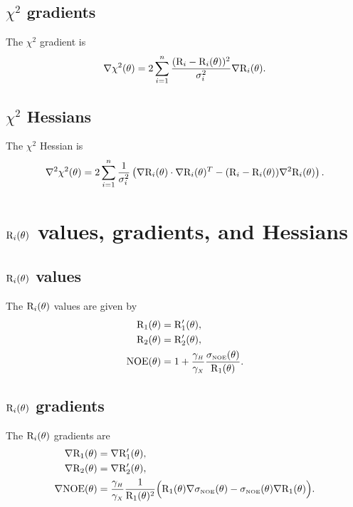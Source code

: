 \subsection{$\chi^2$ gradients}

The $\chi^2$ gradient is
\begin{equation}
 \nabla \chi^2(\theta) = 2 \sum_{i=1}^n \frac{(\mathrm{R}_i - \mathrm{R}_i(\theta))^2}{\sigma_i^2} \nabla \mathrm{R}_i(\theta).
\end{equation}


\subsection{$\chi^2$ Hessians}

The $\chi^2$ Hessian is
\begin{equation}
 \nabla^2 \chi^2(\theta) = 2 \sum_{i=1}^n \frac{1}{\sigma_i^2} \left(\nabla \mathrm{R}_i(\theta) \cdot \nabla \mathrm{R}_i(\theta)^T - (\mathrm{R}_i - \mathrm{R}_i(\theta)) \nabla^2 \mathrm{R}_i(\theta) \right).
\end{equation}




\section{$\mathrm{R}_i(\theta)$ values, gradients, and Hessians}


\subsection{$\mathrm{R}_i(\theta)$ values}

The $\mathrm{R}_i(\theta)$ values are given by
\begin{align}
    \mathrm{R}_1(\theta) & = \mathrm{R}_1'(\theta), \label{eq: Ri trans: R1} \\
    \mathrm{R}_2(\theta) & = \mathrm{R}_2'(\theta), \label{eq: Ri trans: R2} \\
    \mathrm{NOE}(\theta) & = 1 + \frac{\gamma_{\scriptscriptstyle H}}{\gamma_{\scriptscriptstyle X}} \frac{\sigma_{\scriptscriptstyle \mathrm{NOE}}(\theta)}{\mathrm{R}_1(\theta)}. \label{eq: Ri trans: NOE}
\end{align}


\subsection{$\mathrm{R}_i(\theta)$ gradients}

The $\mathrm{R}_i(\theta)$ gradients are
\begin{align}
    \nabla \mathrm{R}_1(\theta) & = \nabla \mathrm{R}_1'(\theta), \label{eq: Ri trans: dR1} \\
    \nabla \mathrm{R}_2(\theta) & = \nabla \mathrm{R}_2'(\theta), \label{eq: Ri trans: dR2} \\
    \nabla \mathrm{NOE}(\theta) & = \frac{\gamma_{\scriptscriptstyle H}}{\gamma_{\scriptscriptstyle X}} \frac{1}{\mathrm{R}_1(\theta)^2} \Big(
        \mathrm{R}_1(\theta) \nabla \sigma_{\scriptscriptstyle \mathrm{NOE}}(\theta) - \sigma_{\scriptscriptstyle \mathrm{NOE}}(\theta) \nabla \mathrm{R}_1(\theta)
    \Big). \label{eq: Ri trans: dNOE}
\end{align}


